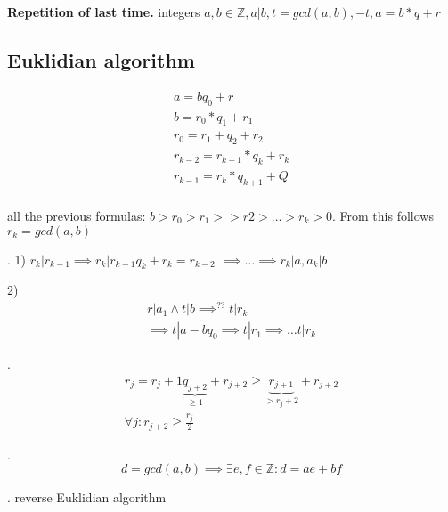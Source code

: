 

\textbf{Repetition of last time.}
integers $a,b \in \mathbb{Z}, a|b, t = gcd(a,b), -t, a = b*q + r$

\subsection{Euklidian algorithm}
\begin{align*}
  a = b q_0 +r \\
  b = r_0*q_1 + r_1 \\
  r_0 = r_1 + q_2 + r_2\\
  r_{k-2} = r_{k-1} * q_k + r_k \\
  r_{k-1} = r_{k} * q_{k+1} + Q \\
\end{align*}

all the previous formulas: $ b > r_0 > r_1 >> r2 > \ldots > r_k > 0$. From this follows $r_k = gcd(a,b)$

\Proof.
1) $r_k | r_{k-1} \implies r_k | r_{k-1} q_k + r_k = r_{k-2}$
  $\implies \ldots \implies r_k | a, a_k | b$

2) 
\begin{align*}
  r | a_1 \wedge t | b \implies^{??} t| r_k \\
  \implies t | a-bq_0 \implies t | r_1 \implies \ldots t|r_k
\end{align*}


\Remark.
\begin{align*}
  r_j = r_j + 1 \underbrace{q_{j+2}}_{ \geq 1} + r_{j+2} \geq \underbrace{r_{j+1}}_{ > r_j+2} + r_{j+2} \\
  \forall j: r_{j+2} \geq \frac{r_j}{2}
\end{align*}

\Theorem.
\[
  d = gcd(a,b) \implies \exists e,f \in \mathbb{Z}: d = ae + bf
\]

\Proof.
reverse Euklidian algorithm


